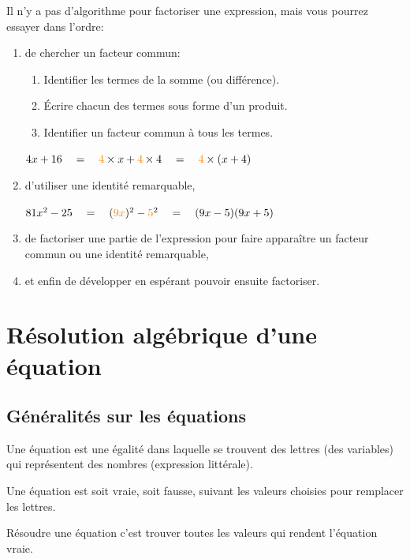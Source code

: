 \documentclass[a4paper,10pt]{report}
\begin{document}
\begin{meth}
Il n'y a pas d'algorithme pour factoriser une expression, mais vous pourrez essayer dans l'ordre:

\begin{enumerate}
\item de chercher un facteur commun:
\begin{enumerate}
\item[•] Identifier les termes de la somme (ou différence).
\item[•] Écrire chacun des termes sous forme d'un produit.
\item[•] Identifier un facteur commun à tous les termes.
\end{enumerate}

\begin{ex}
$4x+16 \quad = \quad \textcolor{orange}{4} \times x + \textcolor{orange}{4} \times 4 \quad = \quad \textcolor{orange}{4} \times (x+4)$
\end{ex}

\item  d'utiliser une identité remarquable,

\begin{ex}
$81x^2 - 25 \quad = \quad (\textcolor{orange}{9x})^2 - \textcolor{orange}{5}^2 \quad = \quad (9x-5)(9x+5)$
\end{ex}

\item de factoriser une partie de l'expression pour faire apparaître un facteur commun ou une identité remarquable,
\item et enfin de développer en espérant pouvoir ensuite factoriser.
\end{enumerate}
\end{meth}

\section{Résolution algébrique d'une équation}

\subsection{Généralités sur les équations}

\begin{defn}
Une équation est une égalité dans laquelle se trouvent des lettres (des variables) qui représentent des nombres (expression littérale).

\noindent Une équation est soit vraie, soit fausse, suivant les valeurs choisies pour remplacer les lettres.

\noindent Résoudre une équation c'est trouver toutes les valeurs qui rendent l'équation vraie.
\end{defn}
\end{document}

